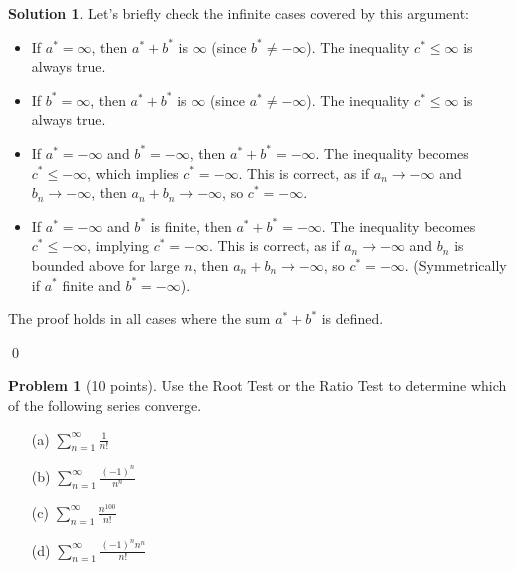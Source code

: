 \documentclass[12pt,oneside]{article}
\theoremstyle{definition}
\newtheorem{problem}{Problem}
\newtheorem*{solution}{Solution} %
\begin{document}
\begin{solution}
Let's briefly check the infinite cases covered by this argument:
\begin{itemize}
    \item If $a^* = \infty$, then $a^*+b^*$ is $\infty$ (since $b^* \ne -\infty$). The inequality $c^* \le \infty$ is always true.
    \item If $b^* = \infty$, then $a^*+b^*$ is $\infty$ (since $a^* \ne -\infty$). The inequality $c^* \le \infty$ is always true.
    \item If $a^* = -\infty$ and $b^* = -\infty$, then $a^*+b^* = -\infty$. The inequality becomes $c^* \le -\infty$, which implies $c^* = -\infty$. This is correct, as if $a_n \to -\infty$ and $b_n \to -\infty$, then $a_n+b_n \to -\infty$, so $c^* = -\infty$.
    \item If $a^* = -\infty$ and $b^*$ is finite, then $a^*+b^* = -\infty$. The inequality becomes $c^* \le -\infty$, implying $c^*=-\infty$. This is correct, as if $a_n \to -\infty$ and $b_n$ is bounded above for large $n$, then $a_n+b_n \to -\infty$, so $c^* = -\infty$. (Symmetrically if $a^*$ finite and $b^*=-\infty$).
\end{itemize}
The proof holds in all cases where the sum $a^*+b^*$ is defined.
\end{solution}
\qed


\bigskip
\bigskip

\begin{problem}[10 points]
Use the Root Test or the Ratio Test to determine which of the following series converge. 
\begin{itemize}
\item[(a)] $\displaystyle \sum_{n=1}^{\infty} \frac{1}{n!}$
\item[(b)] $\displaystyle \sum_{n=1}^{\infty} \frac{(-1)^n}{n^n}$
\item[(c)] $\displaystyle \sum_{n=1}^{\infty} \frac{n^{100}}{n!}$
\item[(d)] $\displaystyle \sum_{n=1}^{\infty} \frac{(-1)^n n^n}{n!}$
\end{itemize}
\end{problem}
\end{document}
